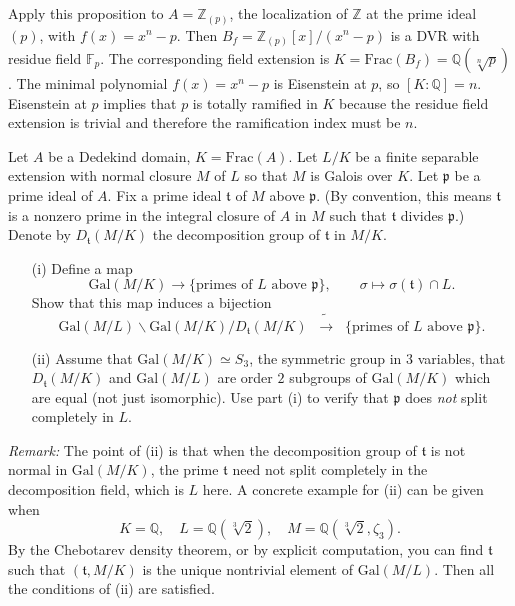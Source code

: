 \documentclass[12pt]{article}  %
\begin{document}
\begin{solution}
\begin{enumerate}
              Apply this proposition to $A=\mathbb{Z}_{(p)}$, the localization of $\mathbb{Z}$ at the prime ideal $(p)$, with $f(x)=x^n - p$. Then $B_f = \mathbb{Z}_{(p)}[x]/(x^n - p)$ is a DVR with residue field $\mathbb{F}_p$. The corresponding field extension is $K = \mathrm{Frac}(B_f) = \mathbb{Q}(\sqrt[n]{p})$. The minimal polynomial $f(x) = x^n-p$ is Eisenstein at $p$, so $[K:\mathbb{Q}]=n$. Eisenstein at $p$ implies that $p$ is totally ramified in $K$ because the residue field extension is trivial and therefore the ramification index must be $n$.
    \end{enumerate}
\end{solution}

\bigskip

\begin{problem}[Problem 2]
Let $A$ be a Dedekind domain, $K = \mathrm{Frac}(A)$. Let $L/K$ be a finite separable extension with normal closure $M$ of $L$ so that $M$ is Galois over $K$. Let $\mathfrak{p}$ be a prime ideal of $A$. Fix a prime ideal $\mathfrak{t}$ of $M$ above $\mathfrak{p}$. (By convention, this means $\mathfrak{t}$ is a nonzero prime in the integral closure of $A$ in $M$ such that $\mathfrak{t}$ divides $\mathfrak{p}$.) Denote by $D_{\mathfrak{t}}(M/K)$ the decomposition group of $\mathfrak{t}$ in $M/K$.
\begin{enumerate}
    \item[(i)] Define a map
          \[
              \mathrm{Gal}(M/K) \to \{\text{primes of $L$ above $\mathfrak{p}$}\},
              \qquad \sigma \mapsto \sigma(\mathfrak{t}) \cap L.
          \]
          Show that this map induces a bijection
          \[
              \mathrm{Gal}(M/L)\backslash \mathrm{Gal}(M/K)/D_{\mathfrak{t}}(M/K) \;\;\tilde{\longrightarrow}\;\; \{\text{primes of $L$ above $\mathfrak{p}$}\}.
          \]
    \item[(ii)] Assume that $\mathrm{Gal}(M/K) \simeq S_3$, the symmetric group in 3 variables, that $D_{\mathfrak{t}}(M/K)$ and $\mathrm{Gal}(M/L)$ are order $2$ subgroups of $\mathrm{Gal}(M/K)$ which are equal (not just isomorphic). Use part (i) to verify that $\mathfrak{p}$ does \emph{not} split completely in $L$.
\end{enumerate}
\textit{Remark:} The point of (ii) is that when the decomposition group of $\mathfrak{t}$ is not normal in $\mathrm{Gal}(M/K)$, the prime $\mathfrak{t}$ need not split completely in the decomposition field, which is $L$ here. A concrete example for (ii) can be given when
\[
    K = \mathbb{Q}, \quad L = \mathbb{Q}(\sqrt[3]{2}), \quad M = \mathbb{Q}(\sqrt[3]{2}, \zeta_3).
\]
By the Chebotarev density theorem, or by explicit computation, you can find $\mathfrak{t}$ such that $(\mathfrak{t}, M/K)$ is the unique nontrivial element of $\mathrm{Gal}(M/L)$. Then all the conditions of (ii) are satisfied.
\end{problem}
\end{document}

